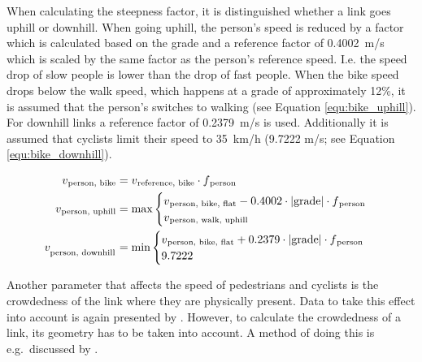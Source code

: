 When calculating the steepness factor, it is distinguished whether a link goes uphill or downhill. When going uphill, the person's speed is reduced by a factor which is calculated based on the grade and a reference factor of 0.4002~m/s which is scaled by the same factor as the person's reference speed. I.e. the speed drop of slow people is lower than the drop of fast people. When the bike speed drops below the walk speed, which happens at a grade of approximately 12\%, it is assumed that the person's switches to walking (see Equation \ref{equ:bike_uphill}). For downhill links a reference factor of 0.2379~m/s is used. Additionally it is assumed that cyclists limit their speed to 35~km/h (9.7222 m/s; see Equation \ref{equ:bike_downhill}).

{\fontsize{12.8pt}{12}
\begin{align}
    v\textsubscript{person, bike} &= v\textsubscript{reference, bike} \cdot f\textsubscript{person}\\
    v\textsubscript{person, uphill} &= \text{max}
    \begin{cases}
        v\textsubscript{person, bike, flat} - 0.4002 \cdot |\text{grade}| \cdot f\textsubscript{person}\\
        v\textsubscript{person, walk, uphill}
    \end{cases}\label{equ:bike_uphill}\\
    v_{\textsubscript{person, downhill}} &= \text{min}
    \begin{cases}
        v\textsubscript{person, bike, flat} + 0.2379 \cdot |\text{grade}| \cdot f\textsubscript{person}\\
        9.7222
    \end{cases}\label{equ:bike_downhill}
\end{align}
}%

Another parameter that affects the speed of pedestrians and cyclists is the crowdedness of the link where they are physically present. Data to take this effect into account is again presented by \citet{Weidmann_TechRep_IVT_1992}. However, to calculate the crowdedness of a link, its geometry has to be taken into account. A method of doing this is e.g.~discussed by \citet{Laemmel_PhDThesis_2011}. 

